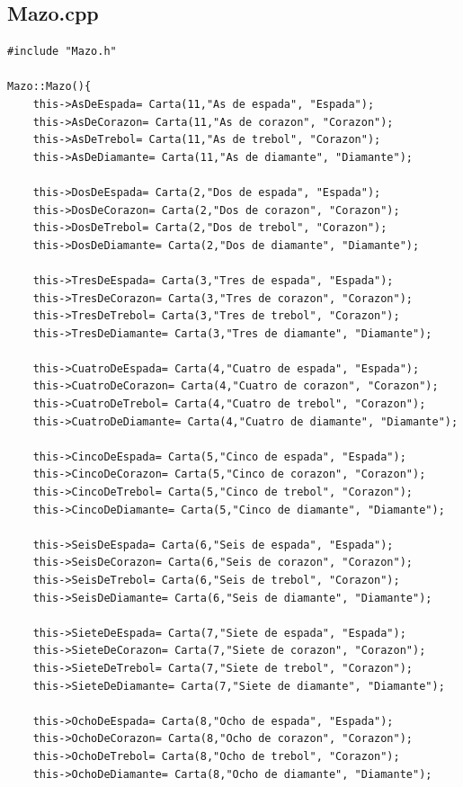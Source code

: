 \documentclass[11pt]{article}
\begin{document}
\subsection{Mazo.cpp}
\begin{lstlisting}
#include "Mazo.h"

Mazo::Mazo(){
    this->AsDeEspada= Carta(11,"As de espada", "Espada");
    this->AsDeCorazon= Carta(11,"As de corazon", "Corazon");
    this->AsDeTrebol= Carta(11,"As de trebol", "Corazon");
    this->AsDeDiamante= Carta(11,"As de diamante", "Diamante");
    
    this->DosDeEspada= Carta(2,"Dos de espada", "Espada");
    this->DosDeCorazon= Carta(2,"Dos de corazon", "Corazon");
    this->DosDeTrebol= Carta(2,"Dos de trebol", "Corazon");
    this->DosDeDiamante= Carta(2,"Dos de diamante", "Diamante");

    this->TresDeEspada= Carta(3,"Tres de espada", "Espada");
    this->TresDeCorazon= Carta(3,"Tres de corazon", "Corazon");
    this->TresDeTrebol= Carta(3,"Tres de trebol", "Corazon");
    this->TresDeDiamante= Carta(3,"Tres de diamante", "Diamante");

    this->CuatroDeEspada= Carta(4,"Cuatro de espada", "Espada");
    this->CuatroDeCorazon= Carta(4,"Cuatro de corazon", "Corazon");
    this->CuatroDeTrebol= Carta(4,"Cuatro de trebol", "Corazon");
    this->CuatroDeDiamante= Carta(4,"Cuatro de diamante", "Diamante");

    this->CincoDeEspada= Carta(5,"Cinco de espada", "Espada");
    this->CincoDeCorazon= Carta(5,"Cinco de corazon", "Corazon");
    this->CincoDeTrebol= Carta(5,"Cinco de trebol", "Corazon");
    this->CincoDeDiamante= Carta(5,"Cinco de diamante", "Diamante");

    this->SeisDeEspada= Carta(6,"Seis de espada", "Espada");
    this->SeisDeCorazon= Carta(6,"Seis de corazon", "Corazon");
    this->SeisDeTrebol= Carta(6,"Seis de trebol", "Corazon");
    this->SeisDeDiamante= Carta(6,"Seis de diamante", "Diamante");

    this->SieteDeEspada= Carta(7,"Siete de espada", "Espada");
    this->SieteDeCorazon= Carta(7,"Siete de corazon", "Corazon");
    this->SieteDeTrebol= Carta(7,"Siete de trebol", "Corazon");
    this->SieteDeDiamante= Carta(7,"Siete de diamante", "Diamante");    

    this->OchoDeEspada= Carta(8,"Ocho de espada", "Espada");
    this->OchoDeCorazon= Carta(8,"Ocho de corazon", "Corazon");
    this->OchoDeTrebol= Carta(8,"Ocho de trebol", "Corazon");
    this->OchoDeDiamante= Carta(8,"Ocho de diamante", "Diamante");    


\end{lstlisting}
\end{document}
